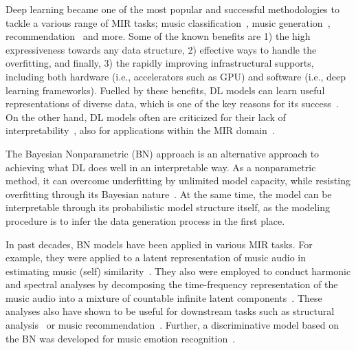 \documentclass{article}
\begin{document}
Deep learning became one of the most popular and successful methodologies to tackle a various range of MIR tasks; music classification~\cite{musicclassification:book}, music generation~\cite{briot2019deep}, recommendation~\cite{10.3389/fams.2019.00044} and more. Some of the known benefits are 1) the high expressiveness towards any data structure, 2) effective ways to handle the overfitting, and finally, 3) the rapidly improving infrastructural supports, including both hardware (i.e., accelerators such as GPU) and software (i.e., deep learning frameworks). Fuelled by these benefits, DL models can learn useful representations of diverse data, which is one of the key reasons for its success~\cite{DBLP:conf/ismir/HumphreyBL12}. On the other hand, DL models often are criticized for their lack of interpretability~\cite{DBLP:conf/dsaa/GilpinBYBSK18}, also for applications within the MIR domain~\cite{DBLP:journals/tmm/Sturm14,DBLP:journals/cie/Sturm16}.

The Bayesian Nonparametric (BN) approach is an alternative approach to achieving what DL does well in an interpretable way. As a nonparametric method, it can overcome underfitting by unlimited model capacity, while resisting overfitting through its Bayesian nature~\cite{DBLP:reference/ml/Teh17}. At the same time, the model can be interpretable through its probabilistic model structure itself, as the modeling procedure is to infer the data generation process in the first place.

In past decades, BN models have been applied in various MIR tasks. For example, they were applied to a latent representation of music audio in estimating music (self) similarity~\cite{DBLP:conf/icassp/QiPC07, DBLP:conf/ismir/HoffmanBC08}. They also were employed to conduct harmonic and spectral analyses by decomposing the time-frequency representation of the music audio into a mixture of countable infinite latent components~\cite{Hoffman09findinglatent, DBLP:conf/icassp/NakanoRKOS11}. These analyses also have shown to be useful for downstream tasks such as structural analysis~\cite{DBLP:conf/icassp/NakanoOKMK12} or music recommendation~\cite{DBLP:conf/ismir/YoshiiG09}. Further, a discriminative model based on the BN was developed for music emotion recognition~\cite{DBLP:journals/taffco/WangLCCH15}.
\end{document}
